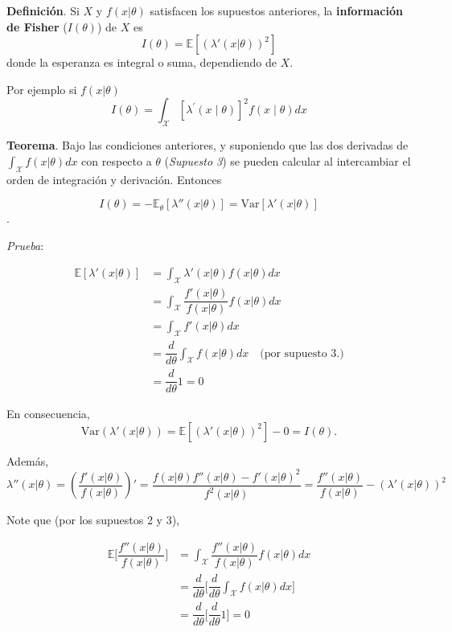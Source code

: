 \documentclass[
  12pt,
]{book}
\begin{document}
\textbf{Definición}. Si \(X\) y \(f(x|\theta)\) satisfacen los supuestos anteriores, la \textbf{información de Fisher} (\(I(\theta)\)) de \(X\) es
\[I(\theta) =\mathbb E[(\lambda'(x|\theta))^2]\]
donde la esperanza es integral o suma, dependiendo de \(X\).

Por ejemplo si \(f(x\vert\theta)\)
\begin{equation}
I(\theta)=\int_{\mathcal{X}}\left[\lambda^{\prime}(x \mid \theta)\right]^{2} f(x \mid \theta) d x
\end{equation}

\textbf{Teorema}. Bajo las condiciones anteriores, y suponiendo que las dos derivadas
de \(\int_{\mathcal X}f(x|\theta)dx\) con respecto a \(\theta\) (\emph{Supuesto 3}) se
pueden calcular al intercambiar el orden de integración y derivación. Entonces

\[I(\theta) = -\mathbb E_{\theta}[\lambda''(x|\theta)] = \text{Var}[\lambda'(x|\theta)]\].

\emph{Prueba}:

\begin{align*}
	\mathbb E[\lambda'(x|\theta)]
  & = \int_{\mathcal X}\lambda'(x|\theta)f(x|\theta)dx                                            \\
  & = \int_{\mathcal X} \dfrac{f'(x|\theta)}{f(x|\theta)}f(x|\theta)dx                            \\
  & =  \int_{\mathcal X}f'(x|\theta)dx                                                            \\
  & = \dfrac d{d\theta}\int_{\mathcal X}f(x|\theta)dx \quad \text{(por supuesto 3.)} \\
  & = \dfrac d{d\theta}1 = 0
\end{align*}

En consecuencia,
\[\text{Var}(\lambda'(x|\theta)) = \mathbb E[(\lambda'(x|\theta))^2]-0 = I(\theta).\]

Además,
\[\lambda''(x|\theta)= \left(\dfrac{f'(x|\theta)}{f(x|\theta)}\right)' = \dfrac{f(x|\theta)f''(x|\theta)-f'(x|\theta)^2}{f^2(x|\theta)} =\dfrac{f''(x|\theta)}{f(x|\theta)} - (\lambda'(x|\theta))^2 \]

Note que (por los supuestos 2 y 3),

\begin{align*}
\mathbb E\bigg[\dfrac{f''(x|\theta)}{f(x|\theta)} \bigg] & = \int_{\mathcal X}\dfrac{f''(x|\theta)}{f(x|\theta)} f(x|\theta)dx \\
&=\dfrac{d}{d\theta}\bigg[\dfrac{d}{d\theta}\int_{\mathcal X}f(x|\theta)dx\bigg]\\
& = \dfrac{d}{d\theta}\bigg[\dfrac{d}{d\theta}1\bigg] = 0
\end{align*}
\end{document}
